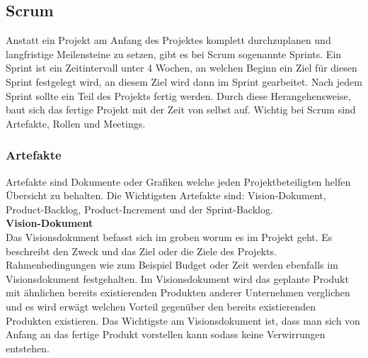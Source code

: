 	\subsection{Scrum}
	Anstatt ein Projekt am Anfang des Projektes komplett durchzuplanen und langfristige Meilensteine zu setzen, gibt es bei Scrum sogenannte Sprints. Ein Sprint ist ein Zeitintervall unter 4 Wochen, an welchen Beginn ein Ziel für diesen Sprint festgelegt wird, an diesem Ziel wird dann im Sprint gearbeitet. Nach jedem Sprint sollte ein Teil des Projekts fertig werden. Durch diese Herangehensweise, baut sich das fertige Projekt mit der Zeit von selbst auf. Wichtig bei Scrum sind Artefakte, Rollen und Meetings.
	\subsubsection{Artefakte}
	\label{sec:Artefakte}
		Artefakte sind Dokumente oder Grafiken welche jeden Projektbeteiligten helfen Übersicht zu behalten. Die Wichtigsten Artefakte sind: Vision-Dokument, Product-Backlog, Product-Increment und der Sprint-Backlog.\\
		
			\textbf{Vision-Dokument}\\
				Das Visionsdokument befasst sich im groben worum es im Projekt geht. Es beschreibt den Zweck und das Ziel oder die Ziele des Projekts. Rahmenbedingungen wie zum Beispiel Budget oder Zeit werden ebenfalls im Visionsdokument festgehalten. Im Visionsdokument wird das geplante Produkt mit ähnlichen bereits existierenden Produkten anderer Unternehmen verglichen und es wird erwägt welchen Vorteil gegenüber den bereits existierenden Produkten existieren.
			Das Wichtigste am Visionsdokument ist, dass man sich von Anfang an das fertige Produkt vorstellen kann sodass keine Verwirrungen entstehen. \\ 
						
